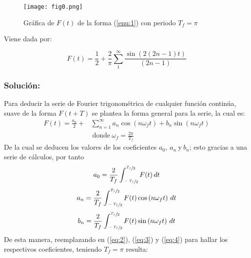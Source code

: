 \begin{multicols}{2}
\begin{figure}[H]
\begin{center}
\texttt{[image: fig0.png]}
\caption{Gráfica de $F(t)$ de la forma (\ref{enu:1}) con periodo $T_f = \pi$}
\label{figenu:1}
\end{center}
\end{figure}
\hspace{12pt} Viene dada por:

\begin{equation}
    F(t) = \frac{1}{2} + \frac{2}{\pi} \sum_{1}^{\infty} \frac{\sin \left(2\left(2n-1\right)t\right)}{\left(2n-1\right)}
    \label{enu:2}
\end{equation}

\subsubsection*{\textbf{Solución:}}

Para deducir la serie de Fourier trigonométrica de cualquier función continúa, suave de la forma $F\left(t+T\right)$ se plantea la forma general para la serie, la cual es:
\begin{align*}
    F(t) = \frac{a_0}{2} + &\sum_{n = 1}^{\infty} a_n \cos\left(n \omega_f t\right) + b_n \sin\left(n \omega_f t\right)\\
    &~\mathrm{donde}~ \omega_f = \frac{2\pi}{T_f}
\end{align*}
De la cual se deducen los valores de los coeficientes $a_0,~ a_n~ \mathrm{y}~ b_n$; esto gracias a una serie de cálculos, por tanto
\begin{equation}
    a_0 = \frac{2}{T_f} \int_{\sfrac{-T_f}{2}}^{\sfrac{T_f}{2}} F(t) \,dt
    \label{eq:2}
\end{equation}
\begin{equation}
    a_n = \frac{2}{T_f} \int_{\sfrac{-T_f}{2}}^{\sfrac{T_f}{2}} F(t) \cos\left(n \omega_f t\right) \,dt
    \label{eq:3}
\end{equation}
\begin{equation}
    b_n = \frac{2}{T_f} \int_{\sfrac{-T_f}{2}}^{\sfrac{T_f}{2}} F(t) \sin\left(n \omega_f t\right) \,dt
    \label{eq:4}
\end{equation}
De esta manera, reemplazando en (\ref{eq:2}), (\ref{eq:3}) y (\ref{eq:4}) para hallar los respectivos coeficientes, teniendo $T_f = \pi$ resulta:


\end{multicols}

